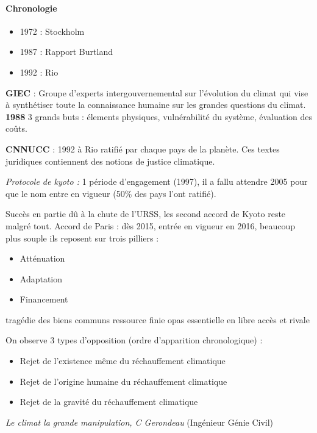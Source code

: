 \documentclass {article}
\newcommand{\V}[0]{\vspace{1\baselineskip}}
\begin{document}
\paragraph{Chronologie}
\begin{itemize}
\item 1972 : Stockholm
\item 1987 : Rapport Burtland
\item 1992 : Rio
\end{itemize}
\V

\textbf{GIEC} : Groupe d'experts intergouvernemental sur l'évolution du climat qui vise à synthétiser toute la connaissance humaine sur les grandes questions du climat. \textbf{1988} 3 grands buts : élements physiques, vulnérabilité du système, évaluation des coûts.
\V

\textbf{CNNUCC} : 1992 à Rio ratifié par chaque pays de la planète. Ces textes juridiques contiennent des notions de justice climatique.
\V

\textit{Protocole de kyoto :} 1 période d'engagement (1997), il a fallu attendre 2005 pour que le nom entre en vigueur (50\% des pays l'ont ratifié).
\V

Succès en partie dû à la chute de l'URSS, les second accord de Kyoto reste malgré tout.
Accord de Paris : dès 2015, entrée en vigueur en 2016, beaucoup plus souple ils reposent sur trois pilliers :
\begin{itemize}
\item Atténuation
\item Adaptation
\item Financement
\end{itemize}

tragédie des biens communs ressource finie opas essentielle en libre accès et rivale


On observe 3 types d'opposition (ordre d'apparition chronologique) : 
\begin{itemize}
\item Rejet de l'existence même du réchauffement climatique
\item Rejet de l'origine humaine du réchauffement climatique
\item Rejet de la gravité du réchauffement climatique

\end{itemize}

\textit{Le climat la grande manipulation, C Gerondeau} (Ingénieur Génie Civil)
\V
\end{document}
